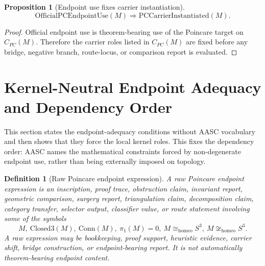 \documentclass[11pt]{article}
\newtheorem{proposition}[theorem]{Proposition}
\newtheorem{definition}[theorem]{Definition}
\newcommand{\Sthree}{S^{3}}
\newcommand{\ClosedThree}{\mathrm{Closed3}}
\newcommand{\Conn}{\mathrm{Conn}}
\newcommand{\CarrierPC}{C_{PC}}
\newcommand{\OfficialPCEndpointUse}{\mathrm{OfficialPCEndpointUse}}
\newcommand{\PCCarrierInst}{\mathrm{PCCarrierInstantiated}}
\newcommand{\Homeo}{\cong_{\mathrm{homeo}}}
\begin{document}
\begin{proposition}[Endpoint use fixes carrier instantiation]\label{prop:endpoint-use-carrier}
\[
\OfficialPCEndpointUse(M)\Rightarrow \PCCarrierInst(M).
\]
\end{proposition}
\begin{proof}
Official endpoint use is theorem-bearing use of the Poincare target on \(\CarrierPC(M)\). Therefore the carrier roles listed in \(\CarrierPC(M)\) are fixed before any bridge, negative branch, route-locus, or comparison report is evaluated.
\end{proof}

\section{Kernel-Neutral Endpoint Adequacy and Dependency Order}\label{sec:kernel-neutral}

This section states the endpoint-adequacy conditions without AASC vocabulary and then shows that they force the local kernel roles. This fixes the dependency order: AASC names the mathematical constraints forced by non-degenerate endpoint use, rather than being externally imposed on topology.

\begin{definition}[Raw Poincare endpoint expression]
A raw Poincare endpoint expression is an inscription, proof trace, obstruction claim, invariant report, geometric comparison, surgery report, triangulation claim, decomposition claim, category transfer, selector output, classifier value, or route statement involving some of the symbols
\[
M,\ \ClosedThree(M),\ \Conn(M),\ \pi_1(M)=0,\ M\Homeo\Sthree,\ M\not\Homeo\Sthree.
\]
A raw expression may be bookkeeping, proof support, heuristic evidence, carrier shift, bridge construction, or endpoint-bearing report. It is not automatically theorem-bearing endpoint content.
\end{definition}
\end{document}

